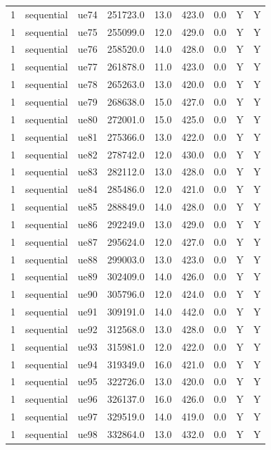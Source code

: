 \begin{table}[ht]
\begin{tabular}{|c|c|c|c|c|c|c|c|c|}
1 & sequential & ue74 & 251723.0 & 13.0 & 423.0 & 0.0 & Y & Y \\
1 & sequential & ue75 & 255099.0 & 12.0 & 429.0 & 0.0 & Y & Y \\
1 & sequential & ue76 & 258520.0 & 14.0 & 428.0 & 0.0 & Y & Y \\
1 & sequential & ue77 & 261878.0 & 11.0 & 423.0 & 0.0 & Y & Y \\
1 & sequential & ue78 & 265263.0 & 13.0 & 420.0 & 0.0 & Y & Y \\
1 & sequential & ue79 & 268638.0 & 15.0 & 427.0 & 0.0 & Y & Y \\
1 & sequential & ue80 & 272001.0 & 15.0 & 425.0 & 0.0 & Y & Y \\
1 & sequential & ue81 & 275366.0 & 13.0 & 422.0 & 0.0 & Y & Y \\
1 & sequential & ue82 & 278742.0 & 12.0 & 430.0 & 0.0 & Y & Y \\
1 & sequential & ue83 & 282112.0 & 13.0 & 428.0 & 0.0 & Y & Y \\
1 & sequential & ue84 & 285486.0 & 12.0 & 421.0 & 0.0 & Y & Y \\
1 & sequential & ue85 & 288849.0 & 14.0 & 428.0 & 0.0 & Y & Y \\
1 & sequential & ue86 & 292249.0 & 13.0 & 429.0 & 0.0 & Y & Y \\
1 & sequential & ue87 & 295624.0 & 12.0 & 427.0 & 0.0 & Y & Y \\
1 & sequential & ue88 & 299003.0 & 13.0 & 423.0 & 0.0 & Y & Y \\
1 & sequential & ue89 & 302409.0 & 14.0 & 426.0 & 0.0 & Y & Y \\
1 & sequential & ue90 & 305796.0 & 12.0 & 424.0 & 0.0 & Y & Y \\
1 & sequential & ue91 & 309191.0 & 14.0 & 442.0 & 0.0 & Y & Y \\
1 & sequential & ue92 & 312568.0 & 13.0 & 428.0 & 0.0 & Y & Y \\
1 & sequential & ue93 & 315981.0 & 12.0 & 422.0 & 0.0 & Y & Y \\
1 & sequential & ue94 & 319349.0 & 16.0 & 421.0 & 0.0 & Y & Y \\
1 & sequential & ue95 & 322726.0 & 13.0 & 420.0 & 0.0 & Y & Y \\
1 & sequential & ue96 & 326137.0 & 16.0 & 426.0 & 0.0 & Y & Y \\
1 & sequential & ue97 & 329519.0 & 14.0 & 419.0 & 0.0 & Y & Y \\
1 & sequential & ue98 & 332864.0 & 13.0 & 432.0 & 0.0 & Y & Y \\

\end{tabular}
\end{table}
